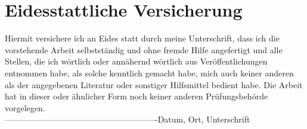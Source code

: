 \documentclass[oneside,bibliography=totocnumbered,BCOR=5mm]{scrbook}%
\begin{document}
\clearpage
{}

\tableofcontents  



 \listoffigures
 

 \listoftables
 


 \lstlistoflistings


\newpage













\printbibliography[
heading=bibintoc,
title={Bibliography}
]


\newpage

\newpage




\newpage
\thispagestyle{empty}       %
\noindent

\section*{Eidesstattliche Versicherung}
Hiermit versichere ich an Eides statt durch meine Unterschrift, dass ich die vorstehende Arbeit selbstst\"andig und ohne fremde Hilfe angefertigt und alle Stellen, die ich w\"ortlich oder ann\"ahernd w\"ortlich aus Ver\"offentlichungen entnommen habe, als solche kenntlich gemacht habe, mich auch keiner anderen als der angegebenen Literatur oder sonstiger Hilfsmittel bedient habe. Die Arbeit hat in dieser oder \"ahnlicher Form noch keiner anderen Pr\"ufungsbeh\"orde vorgelegen.\\
\linebreak[4]
\linebreak[4]
\linebreak[4]
\linebreak[4]
-------------------------------------------------------\linebreak[4]
Datum, Ort, Unterschrift
\end{document}
